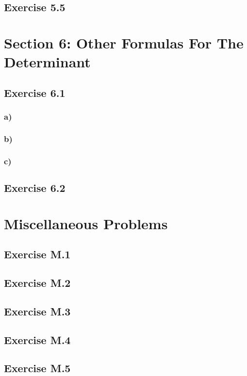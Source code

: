 \documentclass{article}
\begin{document}
\subsection*{Exercise 5.5}

\section*{Section 6: Other Formulas For The Determinant}

\subsection*{Exercise 6.1}

\subsubsection*{a)}
\subsubsection*{b)}
\subsubsection*{c)}

\subsection*{Exercise 6.2}

\section*{Miscellaneous Problems}

\subsection*{Exercise M.1}
\subsection*{Exercise M.2}
\subsection*{Exercise M.3}
\subsection*{Exercise M.4}
\subsection*{Exercise M.5}
\end{document}
